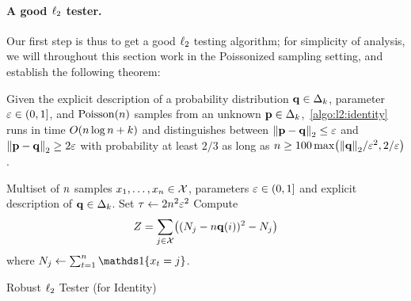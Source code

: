\paragraph{A good $\lp[2]$ tester.} Our first step is thus to get a good $\lp[2]$ testing algorithm; for simplicity of analysis, we will throughout this section work in the Poissonized sampling setting, and establish the following theorem:
\begin{theorem}
  \label{theo:l2:identity:robust}
  Given the explicit description of a probability distribution $\q\in\distribs{\ab}$, parameter $\dst\in(0,1]$, and $\poisson{\ns}$ \iid samples from an unknown $\p\in\distribs{\ab}$,~\cref{algo:l2:identity} runs in time $O(\ns\log \ns + \ab)$ and 
  distinguishes between $\normtwo{\p-\q} \leq \dst$ and $\normtwo{\p-\q} \geq 2\dst$ with probability at least $2/3$ as long as $\ns \geq 100\max\Paren{\normtwo{\q}/\dst^2, 2/\dst}$.
\end{theorem}
\begin{algorithm}[ht!]
  \begin{algorithmic}[1]
    \Require Multiset of $\ns$ samples $x_1,\dots,x_\ns \in \domain$, parameters $\dst\in(0,1]$ and explicit description of $\q\in\distribs{\ab}$.
    \State Set $\tau \gets 2\ns^2\dst^2$
    \State Compute
    \[
        Z = \sum_{j\in\domain} \Paren{(\occur_j-\ns\q(i))^2-\occur_j}
    \] where $\occur_j \gets \sum_{t=1}^\ns\indic{x_t=j}$.
     \Return \reject {}
    \Else\ 
      \Return \accept {}
    \EndIf
  \end{algorithmic}
  \caption{\label{algo:l2:identity}\sc Robust $\lp[2]$ Tester (for Identity)}
\end{algorithm}
